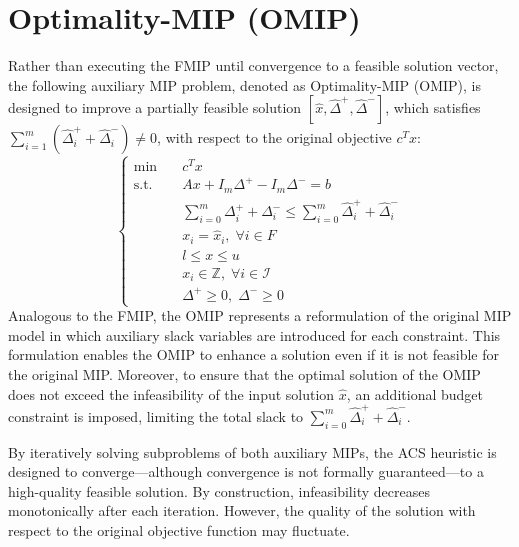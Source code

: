 \section{Optimality-MIP (OMIP)}
Rather than executing the FMIP until convergence to a feasible solution vector, the following auxiliary MIP problem, denoted as Optimality-MIP (OMIP), is designed to improve a partially feasible solution $[\hat{x}, \hat{\Delta}^+, \hat{\Delta}^-]$, which satisfies $\sum_{i=1}^m (\hat{\Delta}_i^+ + \hat{\Delta}_i^-) \neq 0$, with respect to the original objective $c^T x$:
\begin{equation}
\begin{cases}
\text{min} \quad & c^T x \\ \text{s.t.} \quad & Ax + I_m\Delta^+ - I_m\Delta^- = b\\ & \sum_{i=0}^m \Delta_i^{+}+\Delta_i^{-} \le \sum_{i=0}^m \hat\Delta_i^{+}+\hat\Delta_i^{-}\\ & x_i = \hat{x}_i, \; \forall i \in F\\ & l \le x \le u\\ & x_i \in \mathbb{Z},\; \forall i \in \mathcal{I} \\ & \Delta^+ \ge 0, \; \Delta^- \ge 0 
\end{cases}
\end{equation}
Analogous to the FMIP, the OMIP represents a reformulation of the original MIP model in which auxiliary slack variables are introduced for each constraint. This formulation enables the OMIP to enhance a solution even if it is not feasible for the original MIP. Moreover, to ensure that the optimal solution of the OMIP does not exceed the infeasibility of the input solution $\hat{x}$, an additional budget constraint is imposed, limiting the total slack to $\sum_{i=0}^m \hat\Delta_i^{+}+\hat\Delta_i^{-}$.

By iteratively solving subproblems of both auxiliary MIPs, the ACS heuristic is designed to converge—although convergence is not formally guaranteed—to a high-quality feasible solution. By construction, infeasibility decreases monotonically after each iteration. However, the quality of the solution with respect to the original objective function may fluctuate.

